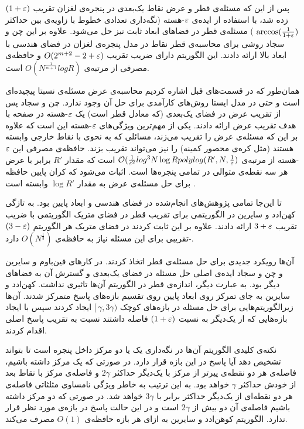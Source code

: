 پس از این که مسئله‌ی قطر و عرض نقاط یک‌بعدی در پنجره‌ی لغزان تقریب $(1+\varepsilon)$ زده شد، با استفاده از ایده‌ی $\varepsilon$-هسته  (نگه‌داری تعدادی خطوط با زاویه‌ی بین حداکثر
$\arccos (\frac{1}{1+\varepsilon})$
) 
مسئله‌ی قطر در فضاهای ابعاد ثابت نیز حل می‌شود. علاوه بر این چن و سجاد روشی برای محاسبه‌ی قطر نقاط در مدل پنجره‌ی لغزان در فضای هندسی با ابعاد بالا ارائه دادند. 
این الگوریتم دارای ضریب تقریب
$O(2^{m+2} -2 + \varepsilon)$
و حافظه‌ی مصرفی از مرتبه‌ی
$O(N^{\frac{1}{m+1}} log R)$
است. 

همان‌طور که در قسمت‌های قبل اشاره کردیم محاسبه‌ی عرض مسئله‌ی نسبتا پیچیده‌ای است و حتی در مدل ایستا روش‌های کارآمدی برای حل آن وجود ندارد. چن و سجاد پس از تقریب عرض در فضای یک‌بعدی (که معادل قطر است) یک $\varepsilon$-هسته در صفحه با هدف تقریب عرض ارائه دادند. یکی از مهم‌ترین ویژگی‌های $\varepsilon$-هسته این است که علاوه بر این که مسئله‌ی عرض را تقریب می‌زند، مسائلی که به نحوی با نقاط خارجی وابسته هستند (مثل کره‌ی محصور کمینه) را نیز می‌تواند تقریب بزند. حافظه‌ی مصرفی این $\varepsilon$-هسته از مرتبه‌ی 
$ \mathcal{O}(\frac{1}{\varepsilon^2} log^3 N \log R polylog(R', N, \frac{1}{\varepsilon})$
است که مقدار $R'$ برابر با عرض هر سه نقطه‌ی متوالی در تمامی پنجره‌ها است. اثبات می‌شود که کران پایین حافظه برای حل مسئله‌ی عرض به مقدار $\log R'$ وابسته است .

تا این‌جا تمامی پژوهش‌های انجام‌شده در فضای هندسی و ابعاد پایین بود. به تازگی کهن‌ادد و سایرین در  الگوریتمی برای تقریب قطر در فضای متریک الگوریتمی با ضریب تقریب $3 + \varepsilon$ ارائه دادند. علاوه بر این ثابت کردند در فضای متریک هر الگوریتم  $(3-\varepsilon)$-تقریبی برای این مسئله نیاز به حافظه‌ی $O(N^\frac{1}{3})$ دارد.

آن‌ها رویکرد جدیدی برای حل مسئله‌ی قطر اتخاذ کردند. در کارهای فین‌باوم و سایرین  و چن و سجاد  ایده‌ی اصلی حل مسئله در فضای یک‌بعدی و گسترش آن به فضاهای دیگر بود. به عبارت دیگر، اندازه‌ی قطر در الگوریتم آن‌ها تاثیری نداشت. کهن‌ادد و سایرین به جای تمرکز روی ابعاد پایین روی تقسیم بازه‌های پاسخ متمرکز شدند. آن‌ها زیرالگوریتم‌هایی برای حل مسئله در بازه‌های کوچک 
$ [\, \gamma, 3 \gamma)$
ایجاد کردند سپس با ایجاد بازه‌هایی که از یک‌دیگر به نسبت $(1+\varepsilon)$ فاصله داشتند نسبت به تقریب پاسخ اصلی اقدام کردند.

نکته‌ی کلیدی الگوریتم آن‌ها در نگه‌داری یک  یا دو مرکز داخل پنجره است تا بتواند تشخیص دهد آیا پاسخ در این بازه قرار دارد.  در صورتی که یک مرکز داشته باشیم، فاصله‌ی هر دو نقطه‌ی پیرتر از  مرکز با یک‌دیگر حداکثر $2 \gamma$ و فاصله‌ی مرکز با نقاط بعد از خودش حداکثر $\gamma$ خواهد بود. به این ترتیب به خاطر ویژگی نامساوی مثلثاتی فاصله‌ی هر دو نقطه‌ای از یک‌دیگر حداکثر برابر با $3 \gamma$ خواهد شد. در صورتی که دو مرکز داشته باشیم فاصله‌ی آن دو بیش از $2 \gamma$ است و در این حالت پاسخ در بازه‌ی مورد نظر قرار ندارد. الگوریتم کوهن‌ادد و سایرین به ازای هر بازه حافظه‌ی $O(1)$ مصرف می‌کند.

